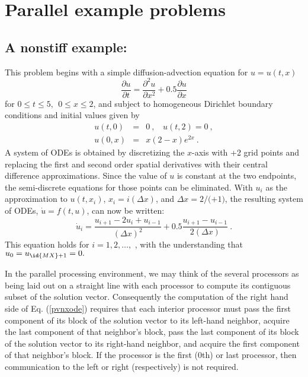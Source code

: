 \section{Parallel example problems}\label{s:ex_parallel}

\subsection{A nonstiff example: }\label{ss:pvnx}

This problem begins with a simple diffusion-advection equation
for $u=u(t,x)$
\begin{equation}
\frac{\partial u}{\partial t}=\frac{\partial ^{2}u}{\partial x^{2}}
   + 0.5\frac{\partial u}{\partial x}  \label{PDE1}
\end{equation}
for $0 \leq t \leq 5, ~~ 0\leq x \leq 2$, and subject to homogeneous
Dirichlet boundary conditions and initial values given by 
\begin{eqnarray}
u(t,0) &=& 0 ~,~~~~u(t,2) = 0 ~, \label{BCIC1} \\
u(0,x) &=& x(2-x)e^{2x} ~. \nonumber
\end{eqnarray}
A system of  ODEs is obtained by discretizing the $x$-axis with +2
grid points and replacing the first and second order spatial derivatives
with their central difference approximations. Since the value of $u$ is
constant at the two endpoints, the semi-discrete equations for those points
can be eliminated.  With $u_{i}$ as the approximation to $u(t,x_{i})$, 
$x_{i} = i(\Delta x)$, and $\Delta x = 2/($$+1)$, the resulting system of
ODEs, $\dot{u} = f(t,u)$, can now be written:
\begin{equation}
\dot{u}_i=\frac{u_{i+1}-2u_{i}+u_{i-1}}{(\Delta x)^{2}}
  + 0.5 \frac{u_{i+1}-u_{i-1}}{2(\Delta x)} ~. \label{pvnxode}
\end{equation}
This equation holds for $i=1,2,\ldots ,$ , with the understanding
that $u_{0} = u_{\id{MX}+1}=0.$

In the parallel processing environment, we may think of the several
processors as being laid out on a straight line with each processor to
compute its contiguous subset of the solution vector.  Consequently
the computation of the right hand side of Eq. (\ref{pvnxode}) requires
that each interior processor must pass the first component of its block of
the solution vector to its left-hand neighbor, acquire the last component of
that neighbor's block, pass the last component of its block of the solution
vector to its right-hand neighbor, and acquire the first component of that
neighbor's block. If the processor is the first ($0$th) or last processor,
then communication to the left or right (respectively) is not required.

